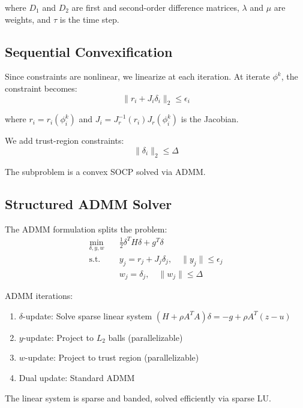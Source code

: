 \documentclass[letterpaper, 10 pt, conference]{ieeeconf}
\begin{document}
where $D_1$ and $D_2$ are first and second-order difference matrices, $\lambda$ and $\mu$ are weights, and $\tau$ is the time step.

\subsection{Sequential Convexification}

Since constraints are nonlinear, we linearize at each iteration. At iterate $\phi^k$, the constraint becomes:
\begin{equation}
\|r_i + J_i \delta_i\|_2 \leq \epsilon_i
\end{equation}

where $r_i = r_i(\phi_i^k)$ and $J_i = J_r^{-1}(r_i) J_r(\phi_i^k)$ is the Jacobian.

We add trust-region constraints:
\begin{equation}
\|\delta_i\|_2 \leq \Delta
\end{equation}

The subproblem is a convex SOCP solved via ADMM.

\subsection{Structured ADMM Solver}

The ADMM formulation splits the problem:
\begin{align}
\min_{\delta, y, w} \quad & \frac{1}{2} \delta^T H \delta + g^T \delta \\
\text{s.t.} \quad & y_j = r_j + J_j \delta_j, \quad \|y_j\| \leq \epsilon_j \nonumber \\
& w_j = \delta_j, \quad \|w_j\| \leq \Delta \nonumber
\end{align}

ADMM iterations:
\begin{enumerate}
\item $\delta$-update: Solve sparse linear system $(H + \rho A^T A) \delta = -g + \rho A^T (z - u)$
\item $y$-update: Project to $L_2$ balls (parallelizable)
\item $w$-update: Project to trust region (parallelizable)
\item Dual update: Standard ADMM
\end{enumerate}

The linear system is sparse and banded, solved efficiently via sparse LU.


\end{document}
